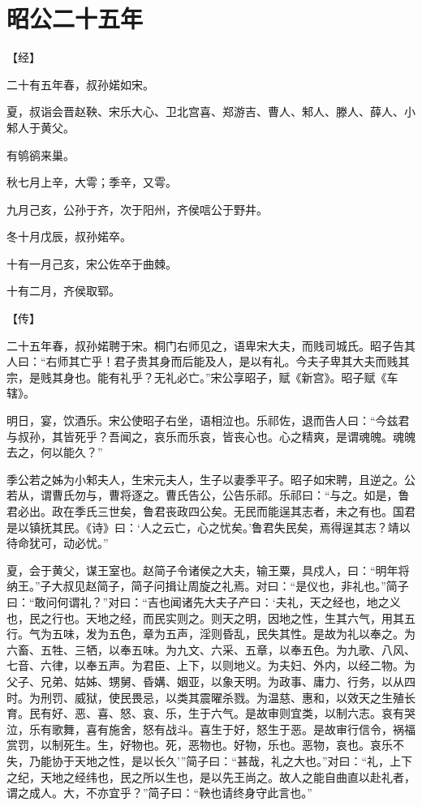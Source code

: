 \documentclass[a4paper,12pt,UTF8,twoside]{ctexbook}
\begin{document}
\chapter{昭公二十五年}



【经】

二十有五年春，叔孙婼如宋。

夏，叔诣会晋赵鞅、宋乐大心、卫北宫喜、郑游吉、曹人、邾人、滕人、薛人、小邾人于黄父。

有鸲鹆来巢。

秋七月上辛，大雩；季辛，又雩。

九月己亥，公孙于齐，次于阳州，齐侯唁公于野井。

冬十月戊辰，叔孙婼卒。

十有一月己亥，宋公佐卒于曲棘。

十有二月，齐侯取郓。

【传】

二十五年春，叔孙婼聘于宋。桐门右师见之，语卑宋大夫，而贱司城氏。昭子告其人曰：“右师其亡乎！君子贵其身而后能及人，是以有礼。今夫子卑其大夫而贱其宗，是贱其身也。能有礼乎？无礼必亡。”宋公享昭子，赋《新宫》。昭子赋《车辖》。

明日，宴，饮酒乐。宋公使昭子右坐，语相泣也。乐祁佐，退而告人曰：“今兹君与叔孙，其皆死乎？吾闻之，哀乐而乐哀，皆丧心也。心之精爽，是谓魂魄。魂魄去之，何以能久？”

季公若之姊为小邾夫人，生宋元夫人，生子以妻季平子。昭子如宋聘，且逆之。公若从，谓曹氏勿与，曹将逐之。曹氏告公，公告乐祁。乐祁曰：“与之。如是，鲁君必出。政在季氏三世矣，鲁君丧政四公矣。无民而能逞其志者，未之有也。国君是以镇抚其民。《诗》曰：‘人之云亡，心之忧矣。’鲁君失民矣，焉得逞其志？靖以待命犹可，动必忧。”

夏，会于黄父，谋王室也。赵简子令诸侯之大夫，输王粟，具戍人，曰：“明年将纳王。”子大叔见赵简子，简子问揖让周旋之礼焉。对曰：“是仪也，非礼也。”简子曰：“敢问何谓礼？”对曰：“吉也闻诸先大夫子产曰：‘夫礼，天之经也，地之义也，民之行也。天地之经，而民实则之。则天之明，因地之性，生其六气，用其五行。气为五味，发为五色，章为五声，淫则昏乱，民失其性。是故为礼以奉之。为六畜、五牲、三牺，以奉五味。为九文、六采、五章，以奉五色。为九歌、八风、七音、六律，以奉五声。为君臣、上下，以则地义。为夫妇、外内，以经二物。为父子、兄弟、姑姊、甥舅、昏媾、姻亚，以象天明。为政事、庸力、行务，以从四时。为刑罚、威狱，使民畏忌，以类其震曜杀戮。为温慈、惠和，以效天之生殖长育。民有好、恶、喜、怒、哀、乐，生于六气。是故审则宜类，以制六志。哀有哭泣，乐有歌舞，喜有施舍，怒有战斗。喜生于好，怒生于恶。是故审行信令，祸福赏罚，以制死生。生，好物也。死，恶物也。好物，乐也。恶物，哀也。哀乐不失，乃能协于天地之性，是以长久’”简子曰：“甚哉，礼之大也。”对曰：“礼，上下之纪，天地之经纬也，民之所以生也，是以先王尚之。故人之能自曲直以赴礼者，谓之成人。大，不亦宜乎？”简子曰：“鞅也请终身守此言也。”
\end{document}
